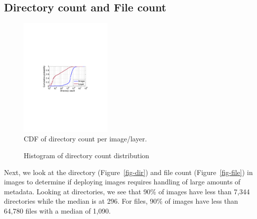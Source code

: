 \subsection{Directory count and File count}
\begin{figure}
	\centering
	\includegraphics[width=0.4\textwidth]{graphs/dir-cnt-cdf.pdf}
	\caption{CDF of directory count per image/layer.
	}
	\label{fig:reference-cnt}
\end{figure}

\begin{figure}[!t]
	\centering
	\caption{Histogram of directory count distribution}
	\label{fig:reference-cnt}
\end{figure}

Next, we look at the directory (Figure~\ref{fig-dir}) and file count
(Figure~\ref{fig-file}) in images to determine if deploying images requires
handling of large amounts of metadata. Looking at directories, we see that 90\%
of images have less than 7,344 directories while the median is at 296. For
files, 90\% of images have less than 64,780 files with a median of 1,090.


